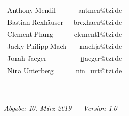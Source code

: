 \documentclass[enabledeprecatedfontcommands,fontsize=11pt,paper=a4,twoside]{scrartcl}
\renewcommand{\headrulewidth}{0pt}
\begin{document}
  \begin{minipage}[H]{\textwidth}
  \begin{center}
  \sf
  \begin{tabular}{lr}
  Anthony Mendil & antmen@tzi.de \\
  Bastian Rexhäuser & brexhaeu@tzi.de\\
  Clement Phung & clement1@tzi.de \\
  Jacky Philipp Mach & machja@tzi.de \\
  Jonah Jaeger & jjaeger@tzi.de \\
  Nina Unterberg & nin\_unt@tzi.de \\
  \end{tabular}
  \\ ~
  \vspace{2cm}
  \\
  \it Abgabe: 10. März 2019 --- Version 1.0\\ ~
  \end{center}
  \end{minipage}



\newpage

  \thispagestyle{fancy}
  \fancyhead{}
  
  \fancyfoot{}
  \renewcommand{\headrulewidth}{0.4pt}
  \tableofcontents

\newpage


\end{document}
